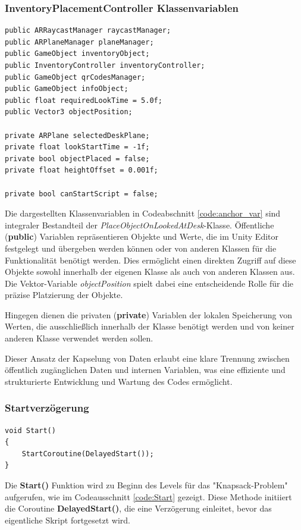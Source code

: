 \subsubsection{InventoryPlacementController Klassenvariablen}
\begin{lstlisting}[style=csharp, caption={Klassenvariablen der InventoryPlacementController Klasse}, label=code:anchor_var]
public ARRaycastManager raycastManager;
public ARPlaneManager planeManager;
public GameObject inventoryObject;
public InventoryController inventoryController;
public GameObject qrCodesManager;
public GameObject infoObject;
public float requiredLookTime = 5.0f;
public Vector3 objectPosition;

private ARPlane selectedDeskPlane;
private float lookStartTime = -1f;
private bool objectPlaced = false;
private float heightOffset = 0.001f;

private bool canStartScript = false;
\end{lstlisting}

Die dargestellten Klassenvariablen in Codeabschnitt \ref{code:anchor_var} sind integraler Bestandteil der
\textit{PlaceObjectOnLookedAtDesk}-Klasse. Öffentliche (\textbf{public}) Variablen repräsentieren Objekte und Werte, die
im Unity Editor festgelegt und übergeben werden können oder von anderen Klassen für die Funktionalität benötigt werden.
Dies ermöglicht einen direkten Zugriff auf diese Objekte sowohl innerhalb der eigenen Klasse als auch von anderen Klassen
aus. Die Vektor-Variable \textit{objectPosition} spielt dabei eine entscheidende Rolle für die präzise Platzierung der
Objekte.

Hingegen dienen die privaten (\textbf{private}) Variablen der lokalen Speicherung von Werten, die ausschließlich innerhalb
der Klasse benötigt werden und von keiner anderen Klasse verwendet werden sollen.

Dieser Ansatz der Kapselung von Daten erlaubt eine klare Trennung zwischen öffentlich zugänglichen Daten und internen
Variablen, was eine effiziente und strukturierte Entwicklung und Wartung des Codes ermöglicht.

\subsubsection{Startverzögerung}
\begin{lstlisting}[style=csharp, caption={Beginn des Inventory Placement Controllers}, label=code:Start]
void Start()
{
    StartCoroutine(DelayedStart());
}
\end{lstlisting}
Die \textbf{Start()} Funktion wird zu Beginn des Levels für das "Knapsack-Problem" aufgerufen, wie im Codeausschnitt
\ref{code:Start} gezeigt. Diese Methode initiiert die Coroutine \textbf{DelayedStart()}, die eine Verzögerung einleitet,
bevor das eigentliche Skript fortgesetzt wird.

